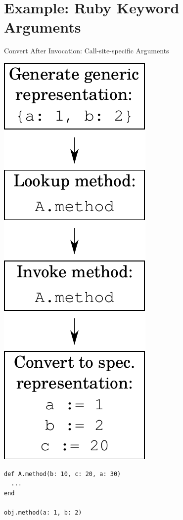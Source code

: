 \documentclass[xcolor=dvipsname]{beamer} %
\begin{document}
\section{Example: Ruby Keyword Arguments}
\begin{frame}[fragile]{Convert After Invocation: Call-site-specific Arguments}
\begin{minipage}{0.25\textwidth}
\centering
\includegraphics[height=0.8\textheight]{convert_after.pdf}
\end{minipage} %
\begin{minipage}{0.7\textwidth}
\begin{lstlisting}
def A.method(b: 10, c: 20, a: 30)
  ...
end

obj.method(a: 1, b: 2)
\end{lstlisting}
\end{minipage}
\end{frame}
\end{document}
